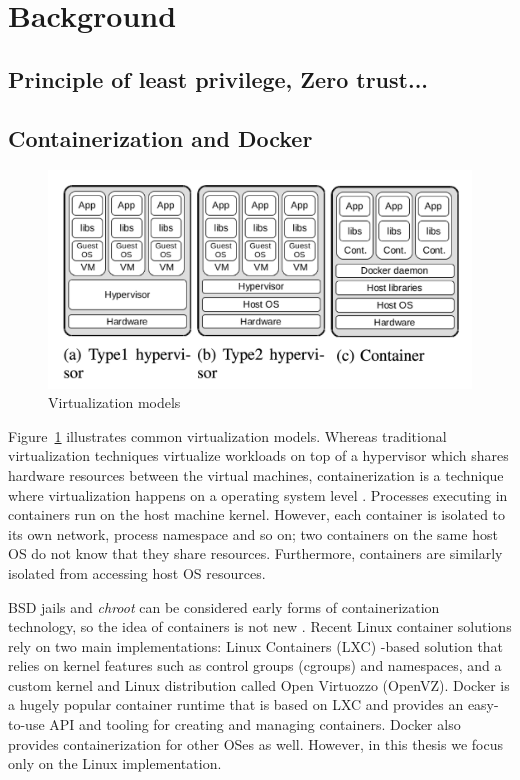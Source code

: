 \documentclass[english, 12pt, a4paper, sci, utf8, a-2b, online]{aaltothesis}
\begin{document}
\clearpage

\section{Background} \label{sec:bg}

\subsection{Principle of least privilege, Zero trust...}

\subsection{Containerization and Docker}

\begin{figure}[h!]
  \centering
  \includegraphics[width=\linewidth]{files/figure-1.png}
  \caption{Virtualization models \cite{combe2016docker}}
  \label{figure-1}
\end{figure}

Figure~\ref{figure-1} illustrates common virtualization models. Whereas traditional virtualization techniques virtualize workloads on top of a hypervisor which shares hardware resources between the virtual machines, containerization is a technique where virtualization happens on a operating system level \cite{merkel2014docker}. Processes executing in containers run on the host machine kernel. However, each container is isolated to its own network, process namespace and so on; two containers on the same host OS do not know that they share resources. Furthermore, containers are similarly isolated from accessing host OS resources.

BSD jails and \textit{chroot} can be considered early forms of containerization technology, so the idea of containers is not new \cite{combe2016docker}. Recent Linux container solutions rely on two main implementations: Linux Containers (LXC) -based solution that relies on kernel features such as control groups (cgroups) and namespaces, and a custom kernel and Linux distribution called Open Virtuozzo (OpenVZ). Docker \cite{docker} is a hugely popular container runtime that is based on LXC and provides an easy-to-use API and tooling for creating and managing containers. Docker also provides containerization for other OSes as well. However, in this thesis we focus only on the Linux implementation.
\end{document}
